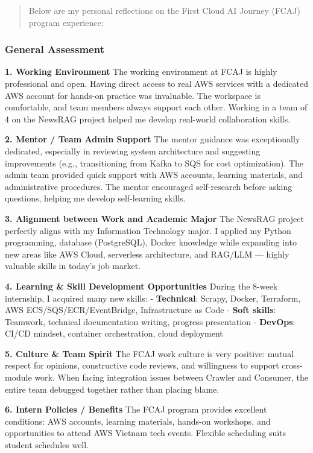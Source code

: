 \begin{quote}
Below are my personal reflections on the First Cloud AI Journey (FCAJ)
program experience:
\end{quote}

\hypertarget{general-assessment}{%
\subsubsection{General Assessment}}

\textbf{1. Working Environment} The working environment at FCAJ is
highly professional and open. Having direct access to real AWS services
with a dedicated AWS account for hands-on practice was invaluable. The
workspace is comfortable, and team members always support each other.
Working in a team of 4 on the NewsRAG project helped me develop
real-world collaboration skills.

\textbf{2. Mentor / Team Admin Support} The mentor guidance was
exceptionally dedicated, especially in reviewing system architecture and
suggesting improvements (e.g., transitioning from Kafka to SQS for cost
optimization). The admin team provided quick support with AWS accounts,
learning materials, and administrative procedures. The mentor encouraged
self-research before asking questions, helping me develop self-learning
skills.

\textbf{3. Alignment between Work and Academic Major} The NewsRAG
project perfectly aligns with my Information Technology major. I applied
my Python programming, database (PostgreSQL), Docker knowledge while
expanding into new areas like AWS Cloud, serverless architecture, and
RAG/LLM --- highly valuable skills in today's job market.

\textbf{4. Learning \& Skill Development Opportunities} During the
8-week internship, I acquired many new skills: - \textbf{Technical}:
Scrapy, Docker, Terraform, AWS ECS/SQS/ECR/EventBridge, Infrastructure
as Code - \textbf{Soft skills}: Teamwork, technical documentation
writing, progress presentation - \textbf{DevOps}: CI/CD mindset,
container orchestration, cloud deployment

\textbf{5. Culture \& Team Spirit} The FCAJ work culture is very
positive: mutual respect for opinions, constructive code reviews, and
willingness to support cross-module work. When facing integration issues
between Crawler and Consumer, the entire team debugged together rather
than placing blame.

\textbf{6. Intern Policies / Benefits} The FCAJ program provides
excellent conditions: AWS accounts, learning materials, hands-on
workshops, and opportunities to attend AWS Vietnam tech events. Flexible
scheduling suits student schedules well.

